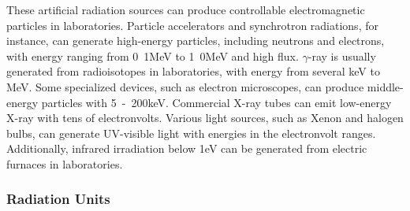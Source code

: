 \documentclass[molecules,review,submit,pdftex,moreauthors]{Definitions/mdpi}
\begin{document}
These artificial radiation sources can produce controllable electromagnetic particles in laboratories.  Particle accelerators and synchrotron radiations, for instance, can generate high-energy particles, including neutrons and electrons, with energy ranging from \unit{0.1}{MeV} to \unit{1.0}{MeV} and high flux.  $\gamma$-ray is usually generated from radioisotopes in laboratories, with energy from several keV to MeV.  Some specialized devices, such as electron microscopes, can produce middle-energy particles with \unit{5 - 200}{keV}.  Commercial X-ray tubes can emit low-energy X-ray with tens of electronvolts.  Various light sources, such as Xenon and halogen bulbs, can generate UV-visible light with energies in the electronvolt ranges.  Additionally, infrared irradiation below \unit{1}{eV} can be generated from electric furnaces in laboratories.  


\subsubsection{Radiation Units}
\end{document}
